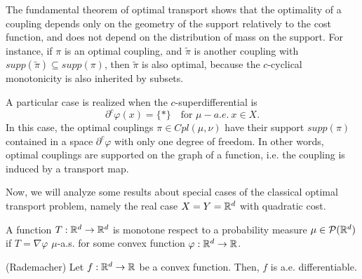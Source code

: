 \documentclass[../main.tex]{subfiles}
\begin{document}
\begin{remark}
    The fundamental theorem of optimal transport shows that the optimality of a coupling depends only on the geometry of the support relatively to the cost function, and does not depend on the distribution of mass on the support. For instance, if $\pi$ is an optimal coupling, and $\tilde\pi$ is another coupling with $supp(\tilde\pi)\subseteq supp(\pi)$, then $\tilde\pi$ is also optimal, because the $c$-cyclical monotonicity is also inherited by subsets.
\end{remark}

\begin{remark}
    A particular case is realized when the $c$-superdifferential is $$\partial^c\varphi(x) =\{*\} \quad \text{for } \mu-a.e. \ x\in X.$$
    In this case, the optimal couplings $\pi\in Cpl(\mu, \nu)$ have their support $supp(\pi)$ contained in a space $\partial^c\varphi$ with only one degree of freedom. In other words, optimal couplings are supported on the graph of a function, i.e. the coupling is induced by a transport map.
\end{remark}

Now, we will analyze some results about special cases of the classical optimal transport problem, namely the real case $X=Y=\mathbb{R}^d$ with quadratic cost.

\begin{definition}
    A function $T: \mathbb{R}^d \to \mathbb{R}^d$ is monotone respect to a probability measure $\mu\in\mathcal{P}(\mathbb{R}^d)$ if $T = \nabla\varphi$ $\mu$-a.s. for some convex function $\varphi: \mathbb{R}^d \to \mathbb{R}$.
\end{definition}

\begin{theorem}
    (Rademacher) 
    Let $f: \mathbb{R}^d \to \mathbb{R}$ be a convex function. Then, $f$ is a.e. differentiable.
\end{theorem}
\end{document}
